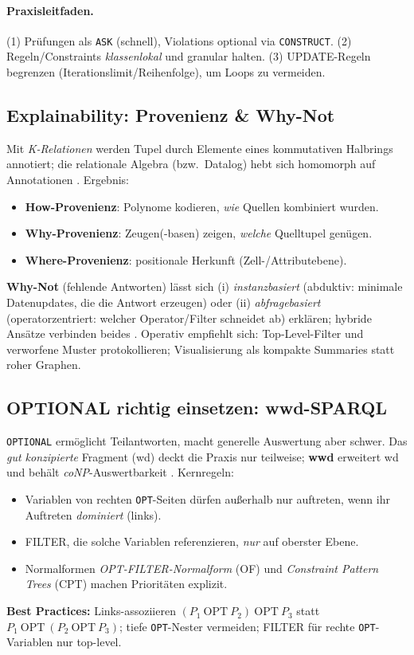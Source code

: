 \paragraph{Praxisleitfaden.}
(1) Prüfungen als \texttt{ASK} (schnell), Violations optional via \texttt{CONSTRUCT}. (2) Regeln/Constraints \emph{klassenlokal} und granular halten. (3) UPDATE-Regeln begrenzen (Iterationslimit/Reihenfolge), um Loops zu vermeiden.

\subsection{Explainability: Provenienz \& Why-Not}
Mit \emph{K-Relationen} werden Tupel durch Elemente eines kommutativen Halbrings annotiert; die relationale Algebra (bzw.\ Datalog) hebt sich homomorph auf Annotationen \cite{green-provenance-semirings}. Ergebnis:
\begin{itemize}
  \item \textbf{How-Provenienz}: Polynome kodieren, \emph{wie} Quellen kombiniert wurden.
  \item \textbf{Why-Provenienz}: Zeugen(-basen) zeigen, \emph{welche} Quelltupel genügen.
  \item \textbf{Where-Provenienz}: positionale Herkunft (Zell-/Attributebene).
\end{itemize}
\textbf{Why-Not} (fehlende Antworten) lässt sich (i) \emph{instanzbasiert} (abduktiv: minimale Datenupdates, die die Antwort erzeugen) oder (ii) \emph{abfragebasiert} (operatorzentriert: welcher Operator/Filter schneidet ab) erklären; hybride Ansätze verbinden beides \cite{herschel-why-why-not,herschel-survey}. Operativ empfiehlt sich: Top-Level-Filter und verworfene Muster protokollieren; Visualisierung als kompakte Summaries statt roher Graphen.

\subsection{OPTIONAL richtig einsetzen: wwd-SPARQL}
\texttt{OPTIONAL} ermöglicht Teilantworten, macht generelle Auswertung aber schwer. Das \emph{gut konzipierte} Fragment (wd) deckt die Praxis nur teilweise; \textbf{wwd} erweitert wd und behält \emph{coNP}-Auswertbarkeit \cite{kaminski-kostylev-beyond-well-designed}. Kernregeln:
\begin{itemize}
  \item Variablen von rechten \texttt{OPT}-Seiten dürfen außerhalb nur auftreten, wenn ihr Auftreten \emph{dominiert} (links).
  \item FILTER, die solche Variablen referenzieren, \emph{nur} auf oberster Ebene.
  \item Normalformen \emph{OPT-FILTER-Normalform} (OF) und \emph{Constraint Pattern Trees} (CPT) machen Prioritäten explizit.
\end{itemize}
\textbf{Best Practices:} Links-assoziieren \((P_1\ \mathrm{OPT}\ P_2)\ \mathrm{OPT}\ P_3\) statt \(P_1\ \mathrm{OPT}\ (P_2\ \mathrm{OPT}\ P_3)\); tiefe \texttt{OPT}-Nester vermeiden; FILTER für rechte \texttt{OPT}-Variablen nur top-level.

